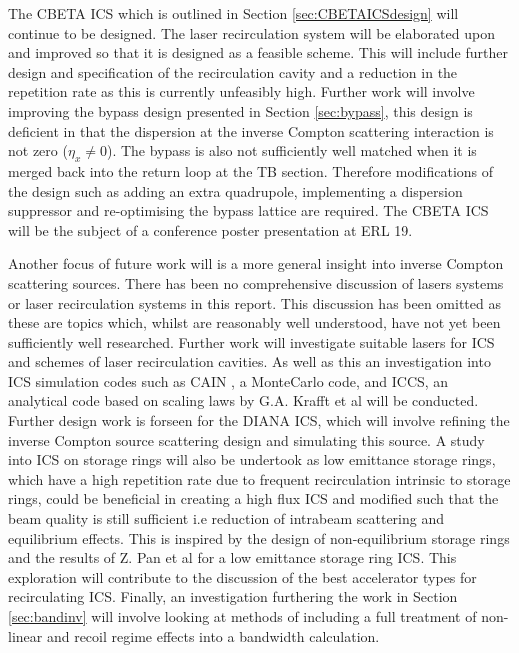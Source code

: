 \documentclass[11pt]{article}
\begin{document}
The CBETA ICS which is outlined in Section \ref{sec:CBETAICSdesign} will continue to be designed. The laser recirculation system will be elaborated upon and improved so that it is designed as a feasible scheme. This will include further design and specification of the recirculation cavity and a reduction in the repetition rate as this is currently unfeasibly high. Further work will involve improving the bypass design presented in Section \ref{sec:bypass}, this design is deficient in that the dispersion at the inverse Compton scattering interaction is not zero ($\eta_{x} \neq 0$). The bypass is also not sufficiently well matched when it is merged back into the return loop at the TB section. Therefore modifications of the design such as adding an extra quadrupole, implementing a dispersion suppressor and re-optimising the bypass lattice are required. The CBETA ICS will be the subject of a conference poster presentation at ERL 19.

Another focus of future work will is a more general insight into inverse Compton scattering sources. There has been no comprehensive discussion of lasers systems or laser recirculation systems in this report. This discussion has been omitted as these are topics which, whilst are reasonably well understood, have not yet been sufficiently well researched. Further work will investigate suitable lasers for ICS and schemes of laser recirculation cavities. As well as this an investigation into ICS simulation codes such as CAIN \cite{CAIN}, a MonteCarlo code, and ICCS, an analytical code based on scaling laws by G.A. Krafft et al  \cite{KrafftTerzic2016} will be conducted. Further design work is forseen for the DIANA ICS, which will involve refining the inverse Compton source scattering design and simulating this source. A study into ICS on storage rings will also be undertook as low emittance storage rings, which have a high repetition rate due to frequent recirculation intrinsic to storage rings, could be beneficial in creating a high flux ICS and modified such that the beam quality is still sufficient i.e reduction of intrabeam scattering and equilibrium effects. This is inspired by the design of non-equilibrium storage rings \cite{NEQring} and the results of Z. Pan et al \cite{PanICS} for a low emittance storage ring ICS. This exploration will contribute to the discussion of the best accelerator types for recirculating ICS. Finally, an investigation furthering the work in Section \ref{sec:bandinv} will involve looking at methods of including a full treatment of non-linear and recoil regime effects into a bandwidth calculation.
\end{document}
